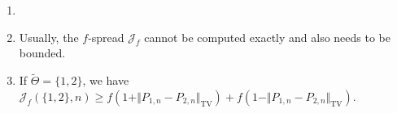 \documentclass[a4paper]{article}
\begin{document}
\begin{remark}
\begin{enumerate}
\item[]
\item Usually, the $f$-spread $\mathcal{J}_{f}$ cannot be computed exactly and also needs to be bounded. 
\item If $\tilde{\Theta}=\{1,2\}$, we have $\mathcal{J}_f(\{1,2\}, n) \geq f(1 + \Vert P_{1,n}-P_{2,n} \Vert_{\mathrm{TV}}) + f(1 - \Vert P_{1,n}-P_{2,n} \Vert_{\mathrm{TV}})$.
\end{enumerate}
\end{remark}







\end{document}

